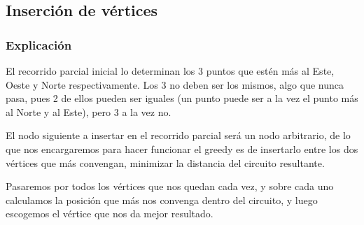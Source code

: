 

\subsection{Inserción de vértices}
\subsubsection{Explicación}
\begin{frame}
	\begin{block}{ }
El recorrido parcial inicial lo determinan los 3 puntos que estén más al Este, Oeste y Norte respectivamente. Los 3 no deben ser los mismos, algo que nunca pasa, pues 2 de ellos pueden ser iguales (un punto puede ser a la vez el punto más al Norte y al Este), pero 3 a la vez no.
	\end{block}

	\begin{block}{ }
	El nodo siguiente a insertar en el recorrido parcial será un nodo arbitrario, de lo 
	que nos encargaremos para hacer funcionar el greedy es de insertarlo entre los dos 
	vértices que más convengan, minimizar la distancia del circuito resultante.

	Pasaremos por todos los vértices que nos quedan cada vez, y sobre cada uno calculamos 
	la posición que más nos convenga dentro del circuito, y luego escogemos el vértice que 
	nos da mejor resultado.
	\end{block}
\end{frame}


